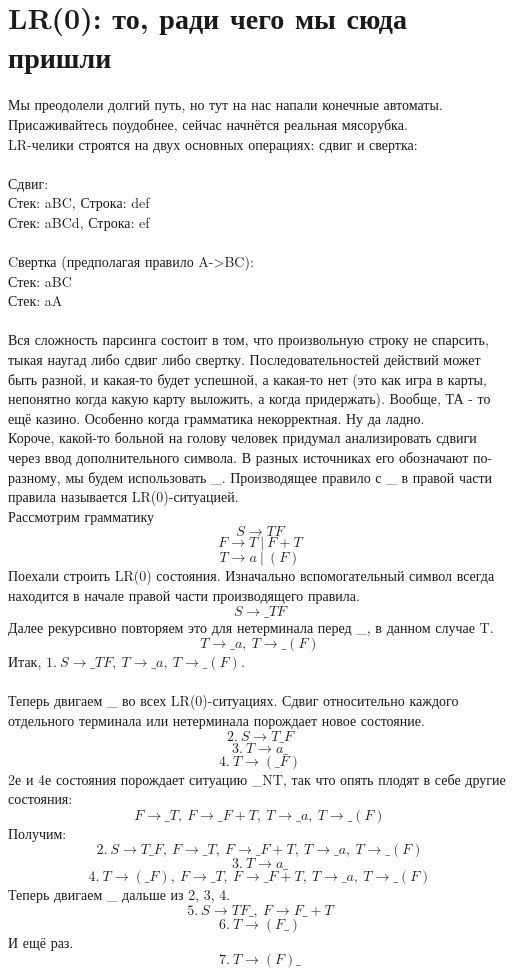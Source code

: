 \documentclass{article}
\begin{document}
\part{LR(0): то, ради чего мы сюда пришли}
Мы преодолели долгий путь, но тут на нас напали конечные автоматы. 
Присаживайтесь поудобнее, сейчас начнётся реальная мясорубка.\\
LR-челики строятся на двух основных операциях: сдвиг и свертка:\\\\
Сдвиг:\\
Стек: aBC, Строка: def\\
Стек: aBCd, Строка: ef\\
\\
Cвертка (предполагая правило A->BC):\\
Стек: aBC\\
Стек: aA\\
\\
Вся сложность парсинга состоит в том, что произвольную строку не спарсить, 
тыкая наугад либо сдвиг либо свертку. Последовательностей действий 
может быть разной, и какая-то будет успешной, а какая-то нет (это как 
игра в карты, непонятно когда какую карту выложить, а когда придержать). 
Вообще, ТА - то ещё казино. Особенно когда грамматика некорректная.
Ну да ладно.\\
Короче, какой-то больной на голову человек придумал анализировать сдвиги
через ввод дополнительного символа. В разных источниках его обозначают
по-разному, мы будем использовать \_. Производящее правило 
с \_ в правой части правила называется LR(0)-ситуацией.\\
Рассмотрим грамматику
$$S\to TF$$
$$F\to T \ | \ F+T$$
$$T\to a \ | \ (F)$$
Поехали строить LR(0) состояния. Изначально вспомогательный символ 
всегда находится в начале правой части производящего правила.
$$S\to \_TF$$
Далее рекурсивно повторяем это для нетерминала перед \_, в данном случае T.
$$T\to \_a, \ T\to \_(F)$$
Итак, $1. \ S\to \_TF, \ T\to \_a, \ T\to \_(F)$.\\\\
Теперь двигаем \_ во всех LR(0)-ситуациях. Сдвиг относительно 
каждого отдельного терминала или нетерминала порождает новое состояние.
$$2. \ S\to T\_F$$
$$3. \ T\to a\_$$
$$4. \ T\to (\_F)$$
2е и 4е состояния порождает ситуацию \_NT, так что опять плодят в себе
другие состояния:
$$F\to \_T, \ F\to \_F+T, \ T\to \_a, \ T\to \_(F)$$
Получим:
$$2. \ S\to T\_F, \ F\to \_T, \ F\to \_F+T, \ T\to \_a, \ T\to \_(F)$$
$$3. \ T\to a\_$$
$$4. \ T\to (\_F), \ F\to \_T, \ F\to \_F+T, \ T\to \_a, \ T\to \_(F)$$
Теперь двигаем \_ дальше из 2, 3, 4. 
$$5. \ S\to TF\_, \ F\to F\_+T$$
$$6. \ T\to (F\_)$$
И ещё раз.
$$7. \ T\to (F)\_$$
\end{document}
